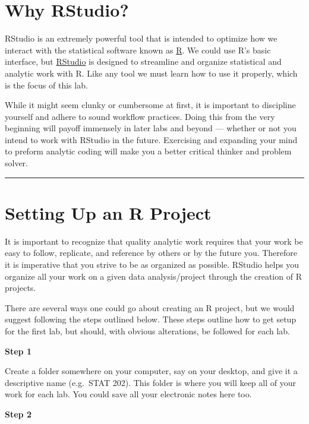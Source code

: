 \documentclass[]{book}
\theoremstyle{definition}
\theoremstyle{definition}
\theoremstyle{definition}
\theoremstyle{remark}
\begin{document}
\section{Why RStudio?}\label{why-rstudio}

RStudio is an extremely powerful tool that is intended to optimize how
we interact with the statistical software known as
\href{https://www.r-project.org/about.html}{R}. We could use R's basic
interface, but \href{https://www.rstudio.com/}{RStudio} is designed to
streamline and organize statistical and analytic work with R. Like any
tool we must learn how to use it properly, which is the focus of this
lab.

While it might seem clunky or cumbersome at first, it is important to
discipline yourself and adhere to sound workflow practices. Doing this
from the very beginning will payoff immensely in later labs and beyond
--- whether or not you intend to work with RStudio in the future.
Exercising and expanding your mind to preform analytic coding will make
you a better critical thinker and problem solver.

\begin{center}\rule{0.5\linewidth}{\linethickness}\end{center}

\section{Setting Up an R Project}\label{setting-up-an-r-project}

It is important to recognize that quality analytic work requires that
your work be easy to follow, replicate, and reference by others or by
the future you. Therefore it is imperative that you strive to be as
organized as possible. RStudio helps you organize all your work on a
given data analysis/project through the creation of R projects.

There are several ways one could go about creating an R project, but we
would suggest following the steps outlined below. These steps outline
how to get setup for the first lab, but should, with obvious
alterations, be followed for each lab.

\textbf{Step 1}

Create a folder somewhere on your computer, say on your desktop, and
give it a descriptive name (e.g.~STAT 202). This folder is where you
will keep all of your work for each lab. You could save all your
electronic notes here too.

\textbf{Step 2}
\end{document}
